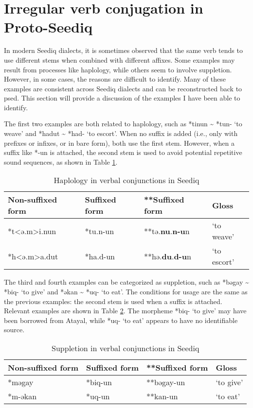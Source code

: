 \section{Irregular verb conjugation in Proto-Seediq} \label{sec:psed_irr_v}

In modern Seediq dialects, it is sometimes observed that the same verb tends to use different stems when combined with different affixes. Some examples may result from processes like haplology, while others seem to involve suppletion. However, in some cases, the reasons are difficult to identify. Many of these examples are consistent across Seediq dialects and can be reconstructed back to \acl{psed}. This section will provide a discussion of the examples I have been able to identify.

The first two examples are both related to haplology, such as *tinun \~{} *tun- `to weave' and *hadut \~{} *had- `to escort'. When no suffix is added (i.e., only with prefixes or infixes, or in bare form), both use the first stem. However, when a suffix like *-un is attached, the second stem is used to avoid potential repetitive sound sequences, as shown in Table \ref{tab:psed_hap}.

\begin{table}[!htbp]
\centering
\caption{Haplology in verbal conjunctions in Seediq}
\label{tab:psed_hap}
\begin{tabular}{llll}
\hline
Non-suffixed form & Suffixed form & **Suffixed form & Gloss       \\ \hline
*t<ə.m>i.nun        & *tu.n-un       & **tə.\textbf{nu}.\textbf{n-u}n      & `to weave'  \\
*h<ə.m>a.dut        & *ha.d-un       & **hə.\textbf{du}.\textbf{d-u}n      & `to escort' \\ \hline
\end{tabular}
\end{table}

The third and fourth examples can be categorized as suppletion, such as *bəgay \~{} *biq- `to give' and *əkan \~{} *uq- `to eat'. The conditions for usage are the same as the previous examples: the second stem is used when a suffix is attached. Relevant examples are shown in Table \ref{tab:psed_supp}. The morpheme *biq- `to give' may have been borrowed from Atayal, while *uq- `to eat' appears to have no identifiable source.

\begin{table}[!htbp]
\centering
\caption{Suppletion in verbal conjunctions in Seediq}
\label{tab:psed_supp}
\begin{tabular}{llll}
\hline
Non-suffixed form & Suffixed form & **Suffixed form & Gloss     \\ \hline
*məgay            & *biq-un       & **bəgay-un      & `to give' \\
*m-əkan           & *uq-un        & **kan-un        & `to eat'  \\ \hline
\end{tabular}
\end{table}

